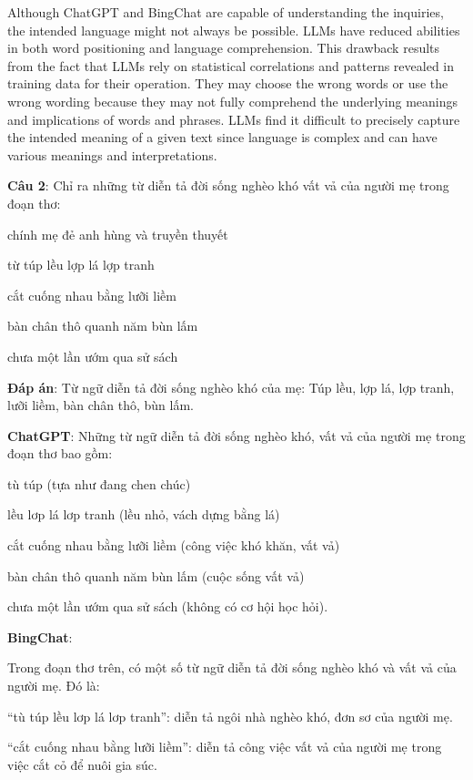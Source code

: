 \documentclass{article}
\begin{document}
{	Although ChatGPT and BingChat are capable of understanding the inquiries, the intended language might not always be possible. LLMs have reduced abilities in both word positioning and language comprehension. This drawback results from the fact that LLMs rely on statistical correlations and patterns revealed in training data for their operation. They may choose the wrong words or use the wrong wording because they may not fully comprehend the underlying meanings and implications of words and phrases. LLMs find it difficult to precisely capture the intended meaning of a given text since language is complex and can have various meanings and interpretations.
	
	
	\begin{mdframed}[linewidth=1pt,linecolor=red] 	
\textbf{Câu 2}: Chỉ ra những từ diễn tả đời sống nghèo khó vất vả của người mẹ trong đoạn thơ: 
		
		chính mẹ đẻ anh hùng và truyền thuyết 
		
		từ túp lều lợp lá lợp tranh 
		
		cắt cuống nhau bằng lưỡi liềm 
		
		bàn chân thô quanh năm bùn lấm 
		
		chưa một lần ướm qua sử sách 
		
		
		\textbf{Đáp án}: Từ ngữ diễn tả đời sống nghèo khó của mẹ: Túp lều, lợp lá, lợp tranh, lưỡi liềm, bàn chân thô, bùn lấm. 
		
		\textbf{ChatGPT}: Những từ ngữ diễn tả đời sống nghèo khó, vất vả của người mẹ trong đoạn thơ bao gồm:
		
		
		tù túp (tựa như đang chen chúc)
		
		lều lơp lá lơp tranh (lều nhỏ, vách dựng bằng lá)
		
		cắt cuống nhau bằng lưỡi liềm (công việc khó khăn, vất vả)
		
		bàn chân thô quanh năm bùn lấm (cuộc sống vất vả)
		
		chưa một lần ướm qua sử sách (không có cơ hội học hỏi).
		
		
		\textbf{BingChat}: 
		
		Trong đoạn thơ trên, có một số từ ngữ diễn tả đời sống nghèo khó và vất vả của người mẹ. Đó là:
		
		
		“tù túp lều lơp lá lơp tranh”: diễn tả ngôi nhà nghèo khó, đơn sơ của người mẹ.
		
		“cắt cuống nhau bằng lưỡi liềm”: diễn tả công việc vất vả của người mẹ trong việc cắt cỏ để nuôi gia súc.
		

\end{mdframed}}
\end{document}
